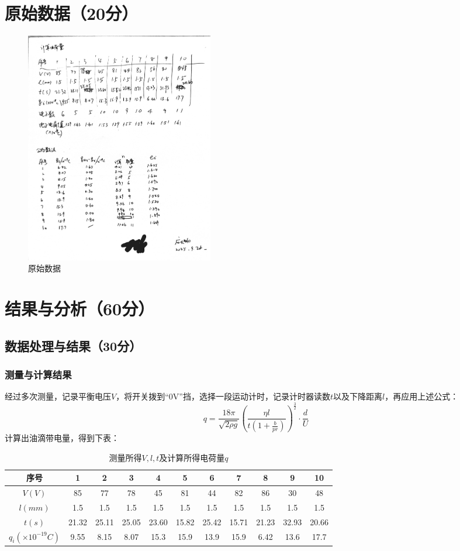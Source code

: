 \documentclass[]{../template/Report}%
\begin{document}
\begin{fullreportonly}
\section{原始数据（20分）}
\begin{figure}[!h]
    \begin{center}
        \includegraphics[width=0.4\textwidth]{exp_data/miligen.jpg}
        \caption{原始数据}
    \end{center}
\end{figure}

\section{结果与分析（60分）}
\subsection{数据处理与结果（30分）}
\subsubsection{测量与计算结果}
经过多次测量，记录平衡电压$V$，将开关拨到“0V”挡，选择一段运动计时，记录计时器读数$t$以及下降距离$l$，再应用上述公式：
\[ q = \frac{18\pi}{\sqrt{2\rho g}} \left( \frac{\eta l}{t\left(1 + \frac{b}{pr}\right)} \right)^{\frac{3}{2}} \cdot \frac{d}{U} \]
计算出油滴带电量，得到下表：
\begin{table}[htbp]
  \centering
  \caption{测量所得$V,l,t$及计算所得电荷量$q$}
  \begin{tabular}{@{}ccccccccccc@{}}
    \toprule
    序号 & 1 & 2 & 3 & 4 & 5 & 6 & 7 & 8 & 9 & 10 \\
    \midrule
    \( V(V) \) & 85 & 77 & 78 & 45 & 81 & 44 & 82 & 86 & 30 & 48 \\
    \( l(mm) \) & 1.5 & 1.5 & 1.5 & 1.5 & 1.5 & 1.5 & 1.5 & 1.5 & 1.5 & 1.5 \\
    \( t(s) \) & 21.32 & 25.11 & 25.05 & 23.60 & 15.82 & 25.42 & 15.71 & 21.23 & 32.93 & 20.66 \\
    \( q_i(\times10^{-19}C) \) & 9.55 & 8.15 & 8.07 & 15.3 & 15.9 & 13.9 & 15.9 & 6.42 & 13.6 & 17.7 \\
    \bottomrule
  \end{tabular}
\end{table}


\end{fullreportonly}
\end{document}
